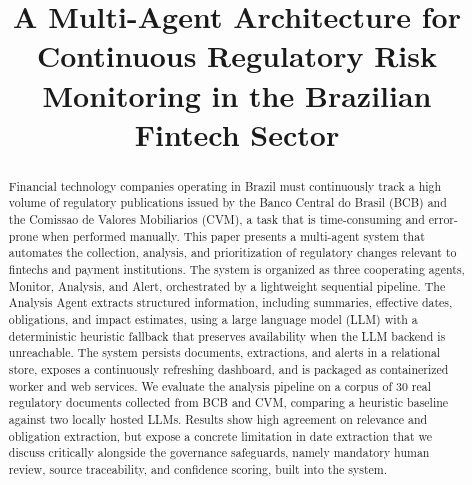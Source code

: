 \documentclass[conference]{IEEEtran}
\begin{document}
\title{A Multi-Agent Architecture for Continuous Regulatory Risk Monitoring in the Brazilian Fintech Sector}

\author{
\and
{}
}

\maketitle

\begin{abstract}
Financial technology companies operating in Brazil must continuously track a high volume of regulatory publications issued by the Banco Central do Brasil (BCB) and the Comissao de Valores Mobiliarios (CVM), a task that is time-consuming and error-prone when performed manually. This paper presents a multi-agent system that automates the collection, analysis, and prioritization of regulatory changes relevant to fintechs and payment institutions. The system is organized as three cooperating agents, Monitor, Analysis, and Alert, orchestrated by a lightweight sequential pipeline. The Analysis Agent extracts structured information, including summaries, effective dates, obligations, and impact estimates, using a large language model (LLM) with a deterministic heuristic fallback that preserves availability when the LLM backend is unreachable. The system persists documents, extractions, and alerts in a relational store, exposes a continuously refreshing dashboard, and is packaged as containerized worker and web services. We evaluate the analysis pipeline on a corpus of 30 real regulatory documents collected from BCB and CVM, comparing a heuristic baseline against two locally hosted LLMs. Results show high agreement on relevance and obligation extraction, but expose a concrete limitation in date extraction that we discuss critically alongside the governance safeguards, namely mandatory human review, source traceability, and confidence scoring, built into the system.
\end{abstract}
\end{document}
